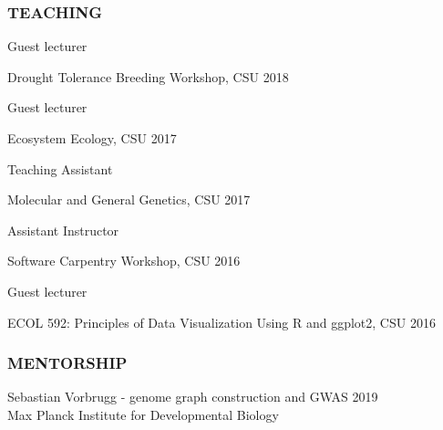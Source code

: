 \documentclass[12pt,english]{article}
\begin{document}
\subsubsection*{TEACHING}
\vspace{-0.5ex}\par
\hspace*{1.0em} Guest lecturer
\par
\hspace*{2.0em} Drought Tolerance Breeding Workshop, CSU
\hfill
2018
\par
\vspace{0.5em}
\hspace*{1.0em} Guest lecturer
\par
\hspace*{2.0em} Ecosystem Ecology, CSU
\hfill
2017
\par
\vspace{0.5em}
\hspace*{1.0em} Teaching Assistant
\par
\hspace*{2.0em} Molecular and General Genetics, CSU
\hfill
2017
\par
\vspace{0.5em}
\hspace*{1.0em} Assistant Instructor
\par
\hspace*{2.0em} Software Carpentry Workshop, CSU
\hfill
2016
\par
\vspace{0.5em}
\hspace*{1.0em} Guest lecturer
\par
\hspace*{2.0em} ECOL 592: Principles of Data Visualization Using R and ggplot2, CSU
\hfill
2016
\vspace{0.5em}
\par

\subsubsection*{MENTORSHIP}
\vspace{-0.5ex}\par
\hspace*{1.0em} Sebastian Vorbrugg -  genome graph construction and GWAS
\hfill
2019\\
\hspace*{2.0em} Max Planck Institute for Developmental Biology
\end{document}

